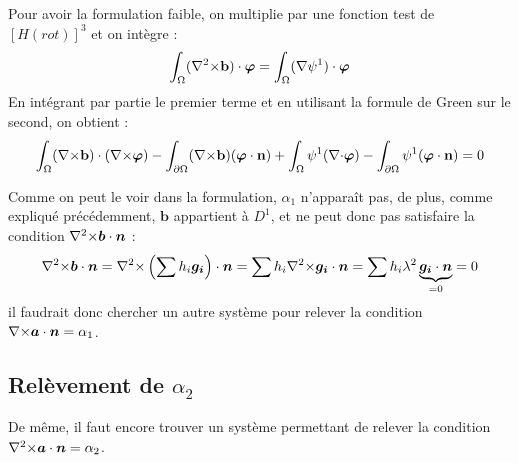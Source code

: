 Pour avoir la formulation faible, on multiplie par une fonction test de $[H(rot)]^3$ et on intègre :
\[ \int_\Omega ({\nabla^2\times} \mathbf{b})\cdot\bm{\varphi} = \int_\Omega ({\nabla}\psi^1)\cdot\bm{\varphi} \]
En intégrant par partie le premier terme et en utilisant la formule de Green sur le second, on obtient :
\begin{equation} \label{fvbcurl}
\int_\Omega ({\nabla\times} \mathbf{b})\cdot({\nabla\times}\bm{\varphi}) - \int_{\partial\Omega} ({\nabla\times} \mathbf{b})(\bm{\varphi}\cdot \mathbf{n}) + \int_\Omega \psi^1({\nabla\cdot}\bm{\varphi}) - \int_{\partial\Omega} \psi^1(\bm{\varphi}\cdot \mathbf{n}) = 0
\end{equation}

Comme on peut le voir dans la formulation, $\alpha_1$ n'apparaît pas, de plus, comme expliqué précédemment, $\bm{b}$ appartient à $D^1$, et ne peut donc pas satisfaire la condition ${\nabla^2\times}\bm{b}\cdot \bm{n}$ :
\[ {\nabla^2\times}\bm{b}\cdot \bm{n} = {\nabla^2\times}\left(\sum h_i \bm{g_i}\right)\cdot\bm{n} = \sum h_i {\nabla^2\times} \bm{g_i}\cdot\bm{n} = \sum h_i\lambda^2 \underbrace{\bm{g_i}\cdot\bm{n}}_{=0} = 0 \]
il faudrait donc chercher un autre système pour relever la condition ${\nabla\times}\bm{a}\cdot\bm{n}=\alpha_1$.

\subsection{Relèvement de $\alpha_2$}
De même, il faut encore trouver un système permettant de relever la condition ${\nabla^2\times}\bm{a}\cdot\bm{n}=\alpha_2$.

